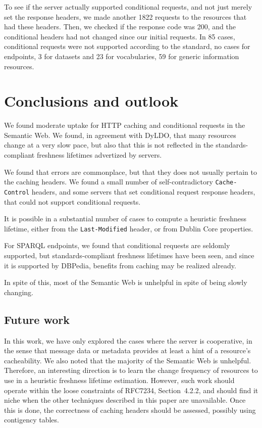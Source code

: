 \documentclass{llncs}
\newcommand{\httph}[1]{\texttt{#1}}
\begin{document}
To see if the server actually supported conditional requests, and not
just merely set the response headers, we made another 1822 requests to
the resources that had these headers. Then, we checked if the response
code was 200, and the conditional headers had not changed since our
initial requests. In 85 cases, conditional requests were not supported
according to the standard, no cases for endpoints, 3 for datasets and
23 for vocabularies, 59 for generic information resources.

\section{Conclusions and outlook}

We found moderate uptake for HTTP caching and conditional requests in
the Semantic Web. We found, in agreement with DyLDO\cite{dyldo2}, that
many resources change at a very slow pace, but also that this is not
reflected in the standards-compliant freshness lifetimes advertized by
servers.

We found that errors are commonplace, but that they does not usually
pertain to the caching headers. We found a small number of
self-contradictory \httph{Cache-Control} headers, and some servers
that set conditional request response headers, that could not support
conditional requests.

It is possible in a substantial number of cases to compute a heuristic
freshness lifetime, either from the \httph{Last-Modified} header, or
from Dublin Core properties. 

For SPARQL endpoints, we found that conditional requests are 
seldomly supported, but standards-compliant freshness lifetimes have
been seen, and since it is supported by DBPedia, benefits from caching
may be realized already.

In spite of this, most of the Semantic Web is unhelpful in spite of
being slowly changing.

\subsection{Future work}

In this work, we have only explored the cases where the server is
cooperative, in the sense that message data or metadata provides at
least a hint of a resource's cacheability. We also noted that the
majority of the Semantic Web is unhelpful. Therefore, an interesting
direction is to learn the change frequency of resources to use in a
heuristic freshness lifetime estimation. However, such work should
operate within the loose constraints of RFC7234, Section~4.2.2, and
should find it niche when the other techniques described in this paper
are unavailable. Once this is done, the correctness of caching headers
should be assessed, possibly using contigency tables.
\end{document}
